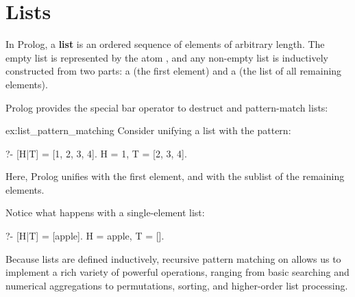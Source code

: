 \section{Lists}
In Prolog, a \textbf{list} is an ordered sequence of elements of arbitrary length. The empty list is represented by the atom \inlinecode{[]}, and any non-empty list is inductively constructed from two parts: a  (the first element) and a  (the list of all remaining elements).

Prolog provides the special bar operator \inlinecode{[H|T]} to destruct and pattern-match lists:

\begin{example}{ex:list_pattern_matching}
Consider unifying a list with the \inlinecode{[H|T]} pattern:

\begin{codeblock}
?- [H|T] = [1, 2, 3, 4].
H = 1,
T = [2, 3, 4].
\end{codeblock}

Here, Prolog unifies  with the first element, and  with the sublist of the remaining elements.

Notice what happens with a single-element list:
\begin{codeblock}
?- [H|T] = [apple].
H = apple,
T = [].
\end{codeblock}

\end{example}

Because lists are defined inductively, recursive pattern matching on \inlinecode{[H|T]} allows us to implement a rich variety of powerful operations, ranging from basic searching and numerical aggregations to permutations, sorting, and higher-order list processing.


